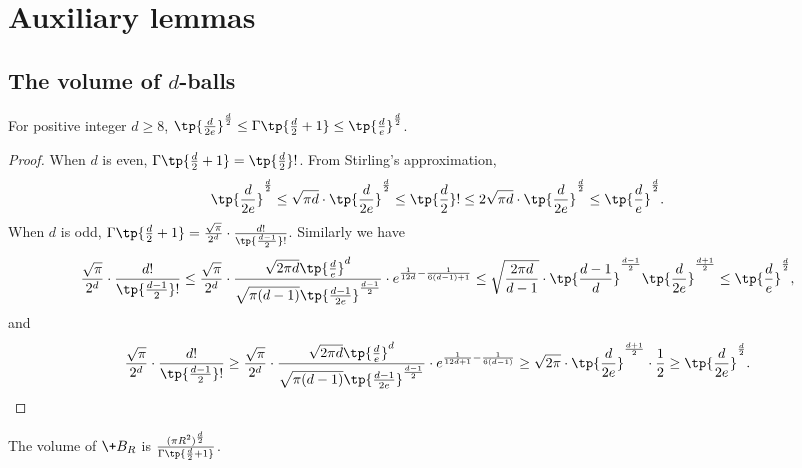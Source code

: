 

\section{Auxiliary lemmas}

\subsection{The volume of $d$-balls}


\begin{proposition}\label{prop:Gamma}
    For positive integer $d\geq 8$, $\tp{\frac{d}{2e}}^{\frac{d}{2}} \leq \Gamma\tp{\frac{d}{2}+1} \leq \tp{\frac{d}{e}}^{\frac{d}{2}}$.
\end{proposition}
\begin{proof}
    When $d$ is even, $\Gamma\tp{\frac{d}{2}+1} = \tp{\frac{d}{2}}!$. From Stirling's approximation,
    \[
        \tp{\frac{d}{2e}}^{\frac{d}{2}} \leq \sqrt{\pi d} \cdot \tp{\frac{d}{2e}}^{\frac{d}{2}} \leq \tp{\frac{d}{2}}! \leq 2\sqrt{\pi d} \cdot \tp{\frac{d}{2e}}^{\frac{d}{2}} \leq \tp{\frac{d}{e}}^{\frac{d}{2}}.
    \]
    When $d$ is odd, $\Gamma\tp{\frac{d}{2}+1} = \frac{\sqrt{\pi}}{2^d}\cdot \frac{d!}{\tp{\frac{d-1}{2}}!}$. Similarly we have
    \[
        \frac{\sqrt{\pi}}{2^d}\cdot \frac{d!}{\tp{\frac{d-1}{2}}!} \leq \frac{\sqrt{\pi}}{2^d}\cdot \frac{\sqrt{2\pi d} \tp{\frac{d}{e}}^d }{ \sqrt{\pi(d-1)}\tp{\frac{d-1}{2e}}^{\frac{d-1}{2}}} \cdot e^{\frac{1}{12d} - \frac{1}{6(d-1)+1}} \leq \sqrt{ \frac{2\pi d}{d-1}}\cdot \tp{\frac{d-1}{d}}^{\frac{d-1}{2}} \tp{\frac{d}{2e}}^{\frac{d+1}{2}} \leq \tp{\frac{d}{e}}^{\frac{d}{2}},
    \]
    and 
    \[
        \frac{\sqrt{\pi}}{2^d}\cdot \frac{d!}{\tp{\frac{d-1}{2}}!} \geq \frac{\sqrt{\pi}}{2^d}\cdot \frac{\sqrt{2\pi d} \tp{\frac{d}{e}}^d }{ \sqrt{\pi(d-1)}\tp{\frac{d-1}{2e}}^{\frac{d-1}{2}}} \cdot e^{\frac{1}{12d+1} - \frac{1}{6(d-1)}} \geq \sqrt{2\pi}\cdot \tp{\frac{d}{2e}}^{\frac{d+1}{2}} \cdot \frac{1}{2} \geq \tp{\frac{d}{2e}}^{\frac{d}{2}}.
    \]
\end{proof}

\begin{proposition}
    The volume of $\+B_R$ is $\frac{(\pi R^2)^\frac{d}{2}}{\Gamma\tp{\frac{d}{2}+1}}$.
\end{proposition}

